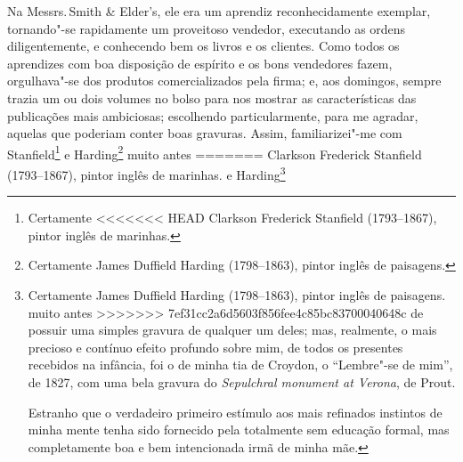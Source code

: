 {{{{{{{{{{{{{{{{{{{{{{{%
Na Messrs.\,Smith \& Elder's, ele era um aprendiz reconhecidamente \label{102}
exemplar, tornando"-se rapidamente um proveitoso vendedor, executando as
ordens diligentemente, e conhecendo bem os livros e os clientes. Como
todos os aprendizes com boa disposição de espírito e os bons vendedores
fazem, orgulhava"-se dos produtos comercializados pela firma; e, aos
domingos, sempre trazia um ou dois volumes no bolso para nos mostrar as
características das publicações mais ambiciosas; escolhendo
particularmente, para me agradar, aquelas que poderiam conter boas
gravuras. Assim, familiarizei"-me com Stanfield\footnote{Certamente
<<<<<<< HEAD
  Clarkson Frederick Stanfield (1793--1867), pintor inglês de marinhas.} e Harding\footnote{Certamente James Duffield Harding
  (1798--1863), pintor inglês de paisagens.} muito antes
=======
  Clarkson Frederick Stanfield (1793--1867), pintor inglês de marinhas.
   e Harding\footnote{Certamente James Duffield Harding
  (1798--1863), pintor inglês de paisagens.  muito antes
>>>>>>> 7ef31cc2a6d5603f856fee4c85bc83700040648c
de possuir uma simples gravura de qualquer um deles; mas, realmente, o
mais precioso e contínuo efeito profundo sobre mim, de todos os
presentes recebidos na infância, foi o de minha tia de Croydon, o
``Lembre"-se de mim'', de 1827, com uma bela gravura do \textit{Sepulchral
monument at Verona}, de Prout.

Estranho que o verdadeiro primeiro estímulo aos mais refinados instintos
de minha mente tenha sido fornecido pela totalmente sem educação formal,
mas completamente boa e bem intencionada irmã de minha mãe.

}}}}}}}}}}}}}}}}}}}}}}}}
